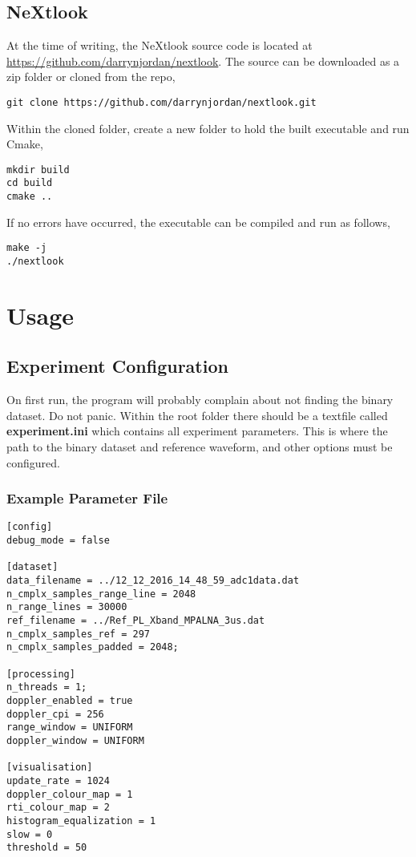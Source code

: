 \documentclass[a4paper,11pt]{report}
\begin{document}
\section{NeXtlook}
At the time of writing, the NeXtlook source code is located at \url{https://github.com/darrynjordan/nextlook}. The source can be downloaded as a zip folder or cloned from the repo,
\begin{lstlisting}
git clone https://github.com/darrynjordan/nextlook.git
\end{lstlisting}
Within the cloned folder, create a new folder to hold the built executable and run Cmake,
\begin{lstlisting}
mkdir build
cd build
cmake ..
\end{lstlisting}
If no errors have occurred, the executable can be compiled and run as follows,
\begin{lstlisting}
make -j
./nextlook
\end{lstlisting}

\chapter{Usage}
\section{Experiment Configuration}
On first run, the program will probably complain about not finding the binary dataset. Do not panic. Within the root folder there should be a textfile called \textbf{experiment.ini} which contains all experiment parameters. This is where the path to the binary dataset and reference waveform, and other options must be configured.

\subsection{Example Parameter File}
\begin{lstlisting}
[config]
debug_mode = false

[dataset]
data_filename = ../12_12_2016_14_48_59_adc1data.dat
n_cmplx_samples_range_line = 2048
n_range_lines = 30000
ref_filename = ../Ref_PL_Xband_MPALNA_3us.dat
n_cmplx_samples_ref = 297
n_cmplx_samples_padded = 2048;

[processing]
n_threads = 1;
doppler_enabled = true
doppler_cpi = 256
range_window = UNIFORM
doppler_window = UNIFORM

[visualisation]
update_rate = 1024
doppler_colour_map = 1
rti_colour_map = 2
histogram_equalization = 1
slow = 0
threshold = 50
\end{lstlisting}
\end{document}
